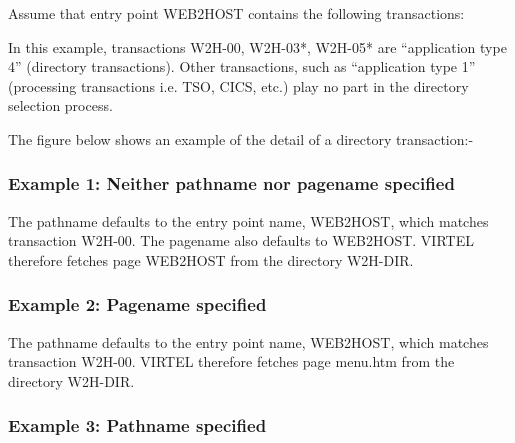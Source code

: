 \documentclass[letterpaper,10pt,english]{sphinxmanual}
\begin{document}
Assume that entry point WEB2HOST contains the following transactions:


In this example, transactions W2H-00, W2H-03*, W2H-05* are  “application type 4” (directory transactions). Other transactions, such as “application type 1” (processing transactions i.e. TSO, CICS, etc.) play no part in the directory selection process.

The figure below shows an example of the detail of a directory transaction:-



\subsubsection{Example 1: Neither pathname nor pagename specified}
\label{\detokenize{User_Guide:example-1-neither-pathname-nor-pagename-specified}}
\begin{sphinxVerbatim}[commandchars=\\\{\}]
\end{sphinxVerbatim}

The pathname defaults to the entry point name, WEB2HOST, which  matches transaction W2H-00. The pagename also defaults to WEB2HOST.  VIRTEL therefore fetches page WEB2HOST from the directory W2H-DIR.


\subsubsection{Example 2: Pagename specified}
\label{\detokenize{User_Guide:example-2-pagename-specified}}
\begin{sphinxVerbatim}[commandchars=\\\{\}]
\end{sphinxVerbatim}

The pathname defaults to the entry point name, WEB2HOST, which matches transaction W2H-00. VIRTEL therefore fetches page menu.htm from the directory W2H-DIR.


\subsubsection{Example 3: Pathname specified}
\label{\detokenize{User_Guide:example-3-pathname-specified}}
\begin{sphinxVerbatim}[commandchars=\\\{\}]
\end{sphinxVerbatim}
\end{document}
